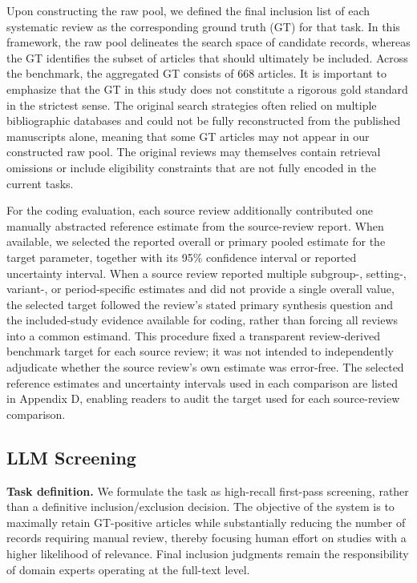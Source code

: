 Upon constructing the raw pool, we defined the final inclusion list of each systematic review as the corresponding ground truth (GT) for that task. In this framework, the raw pool delineates the search space of candidate records, whereas the GT identifies the subset of articles that should ultimately be included. Across the benchmark, the aggregated GT consists of 668 articles. It is important to emphasize that the GT in this study does not constitute a rigorous gold standard in the strictest sense. The original search strategies often relied on multiple bibliographic databases and could not be fully reconstructed from the published manuscripts alone, meaning that some GT articles may not appear in our constructed raw pool. The original reviews may themselves contain retrieval omissions or include eligibility constraints that are not fully encoded in the current tasks.

For the coding evaluation, each source review additionally contributed one manually abstracted reference estimate from the source-review report. When available, we selected the reported overall or primary pooled estimate for the target parameter, together with its 95\% confidence interval or reported uncertainty interval. When a source review reported multiple subgroup-, setting-, variant-, or period-specific estimates and did not provide a single overall value, the selected target followed the review's stated primary synthesis question and the included-study evidence available for coding, rather than forcing all reviews into a common estimand. This procedure fixed a transparent review-derived benchmark target for each source review; it was not intended to independently adjudicate whether the source review's own estimate was error-free. The selected reference estimates and uncertainty intervals used in each comparison are listed in Appendix D, enabling readers to audit the target used for each source-review comparison.

\subsection{LLM Screening}

\textbf{Task definition.}
We formulate the task as high-recall first-pass screening, rather than a definitive inclusion/exclusion decision. The objective of the system is to maximally retain GT-positive articles while substantially reducing the number of records requiring manual review, thereby focusing human effort on studies with a higher likelihood of relevance. Final inclusion judgments remain the responsibility of domain experts operating at the full-text level.

